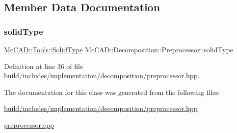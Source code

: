 \subsection{Member Data Documentation}
\mbox{\label{classMcCAD_1_1Decomposition_1_1Preprocessor_a556f8a0b05725f3c17f828fb4c23e9a9}} 
\subsubsection{\texorpdfstring{solid\+Type}{solidType}}
{\footnotesize\ttfamily \hyperlink{classMcCAD_1_1Tools_1_1SolidType}{Mc\+C\+A\+D\+::\+Tools\+::\+Solid\+Type} Mc\+C\+A\+D\+::\+Decomposition\+::\+Preprocessor\+::solid\+Type}



Definition at line 36 of file build/includes/implementation/decomposition/preprocessor.\+hpp.



The documentation for this class was generated from the following files\+:\begin{DoxyCompactItemize}
\item 
\hyperlink{build_2includes_2implementation_2decomposition_2preprocessor_8hpp}{build/includes/implementation/decomposition/preprocessor.\+hpp}\item 
\hyperlink{preprocessor_8cpp}{preprocessor.\+cpp}\end{DoxyCompactItemize}
